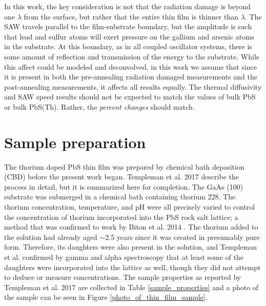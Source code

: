 In this work, the key consideration is not that the radiation damage is beyond one $\lambda$ from the surface, but rather that the entire thin film is thinner than $\lambda$. The SAW travels parallel to the film-substrate boundary, but the amplitude is such that lead and sulfur atoms will exert pressure on the gallium and arsenic atoms in the substrate. At this boundary, as in all coupled oscillator systems, there is some amount of reflection and transmission of the energy to the substrate. While this affect could be modeled and deconvolved, in this work we assume that since it is present in both the pre-annealing radiation damaged measurements and the post-annealing measurements, it affects all results equally. The thermal diffusivity and SAW speed results should not be expected to match the values of bulk PbS or bulk PbS(Th). Rather, the \emph{percent changes} should match.

\section{Sample preparation}
The thorium doped PbS thin film was prepared by chemical bath deposition (CBD) before the present work began. Templeman et al. 2017 \cite{Templeman2017} describe the process in detail, but it is summarized here for completion. The GaAs (100) substrate was submerged in a chemical bath containing thorium 228. The thorium concentration, temperature, and pH were all precisely varied to control the concentration of thorium incorporated into the PbS rock salt lattice; a method that was confirmed to work by Biton et al. 2014 \cite{Biton2014}. The thorium added to the solution had already aged $\sim$2.5 years since it was created in presumably pure form. Therefore, its daughters were also present in the solution, and Templeman et al. confirmed by gamma and alpha spectroscopy that at least some of the daughters were incorporated into the lattice as well, though they did not attempt to deduce or measure concentrations. The sample properties as reported by Templeman et al. 2017 are collected in Table \ref{sample_properties} and a photo of the sample can be seen in Figure \ref{photo_of_thin_film_sample}.

